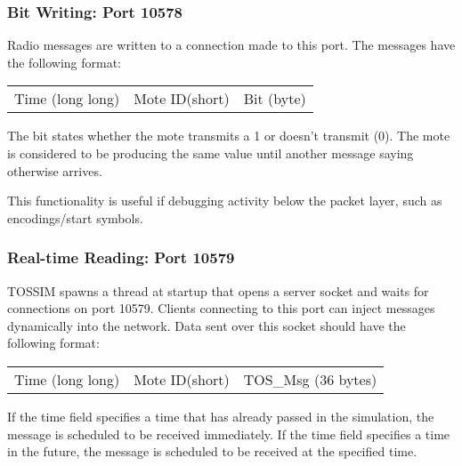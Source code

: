 \documentclass[12pt]{article}
\begin{document}
\subsubsection*{Bit Writing: Port 10578}

Radio messages are written to a connection made to this port. The
messages have the following format:

\vspace{0.1in}
\begin{tabular}{|c|c|c|}\hline
\hspace{4in} & \hspace{1in} & \hspace{0.5in} \\ \hline
Time (long long)& Mote ID(short) & Bit (byte) \\ \hline
\end{tabular}
\vspace{0.1in}

The bit states whether the mote transmits a 1 or doesn't transmit
(0). The mote is considered to be producing the same value until
another message saying otherwise arrives.

This functionality is useful if debugging activity below the packet
layer, such as encodings/start symbols.

\subsubsection*{Real-time Reading: Port 10579}

TOSSIM spawns a thread at startup that opens a server socket and waits
for connections on port 10579. Clients connecting to this port can
inject messages dynamically into the network. Data sent over this
socket should have the following format:

\vspace{0.1in}
\begin{tabular}{|c|c|c|}\hline
\hspace{2in} & \hspace{2in} & \hspace{0.5in} \\ \hline
Time (long long)& Mote ID(short) & TOS\_Msg (36 bytes) \\ \hline
\end{tabular}
\vspace{0.1in}

If the time field specifies a time that has already passed in the
simulation, the message is scheduled to be received immediately. If
the time field specifies a time in the future, the message is
scheduled to be received at the specified time.
\end{document}
